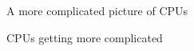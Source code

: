 \documentclass[sans,mathserif]{beamer}
\begin{document}
\begin{frame}
  \begin{center}
    \LARGE A more complicated picture of CPUs
  \end{center}
\end{frame}

\begin{frame}{CPUs getting more complicated}
  \begin{center}
  \end{center}
  
\end{frame}
\end{document}
